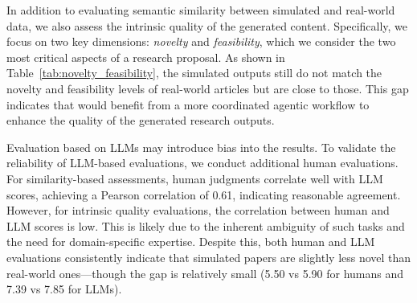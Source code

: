  In addition to evaluating semantic similarity between simulated and real-world data, we also assess the intrinsic quality of the generated content. Specifically, we focus on two key dimensions: \textit{novelty} and \textit{feasibility}, which we consider the two most critical aspects of a research proposal. As shown in Table~\ref{tab:novelty_feasibility}, the simulated outputs still do not match the novelty and feasibility levels of real-world articles but are close to those. This gap indicates that \envname would benefit from a more coordinated agentic workflow to enhance the quality of the generated research outputs.

 Evaluation based on LLMs may introduce bias into the results. To validate the reliability of LLM-based evaluations, we conduct additional human evaluations. For similarity-based assessments, human judgments correlate well with LLM scores, achieving a Pearson correlation of 0.61, indicating reasonable agreement. However, for intrinsic quality evaluations, the correlation between human and LLM scores is low. This is likely due to the inherent ambiguity of such tasks and the need for domain-specific expertise. Despite this, both human and LLM evaluations consistently indicate that simulated papers are slightly less novel than real-world ones—though the gap is relatively small (5.50 vs 5.90 for humans and 7.39 vs 7.85 for LLMs).



